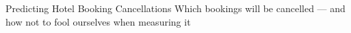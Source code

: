 \documentclass[11pt,a4paper]{article}
\begin{document}
  {Predicting Hotel Booking Cancellations}
  {Which bookings will be cancelled — and how not to fool ourselves when measuring it}
  {\TBLinks}
\tableofcontents

\end{document}
